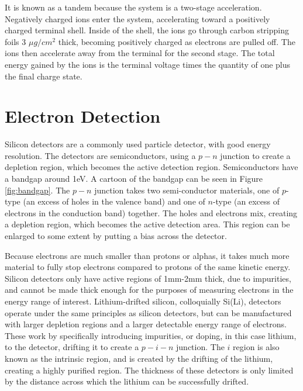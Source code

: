 It is known as a tandem because the system is a two-stage acceleration. Negatively charged ions enter the system, accelerating toward a positively charged terminal shell. Inside of the shell, the ions go through carbon stripping foils 3 $\mu g/cm^2$ thick, becoming positively charged as electrons are pulled off. The ions then accelerate away from the terminal for the second stage. The total energy gained by the ions is the terminal voltage times the quantity of one plus the final charge state.



\section{Electron Detection}

Silicon detectors are a commonly used particle detector, with good energy resolution. The detectors are semiconductors, using a $p-n$ junction to create a depletion region, which becomes the active detection region\citep{knoll00:rad_det_meas}. Semiconductors have a bandgap around 1eV. A cartoon of the bandgap can be seen in Figure \ref{fig:bandgap}. The $p-n$ junction takes two semi-conductor materials, one of $p$-type (an excess of holes in the valence band) and one of $n$-type (an excess of electrons in the conduction band) together. The holes and electrons mix, creating a depletion region, which becomes the active detection area. This region can be enlarged to some extent by putting a bias across the detector.



Because electrons are much smaller than protons or alphas, it takes much more material to fully stop electrons compared to protons of the same kinetic energy. Silicon detectors only have active regions of 1mm-2mm thick, due to impurities, and cannot be made thick enough for the purposes of measuring electrons in the energy range of interest. Lithium-drifted silicon, colloquially Si(Li), detectors operate under the same principles as silicon detectors, but can be manufactured with larger depletion regions and a larger detectable energy range of electrons. These work by specifically introducing impurities, or doping, in this case lithium, to the detector, drifting it to create a $p-i-n$ junction. The $i$ region is also known as the intrinsic region, and is created by the drifting of the lithium, creating a highly purified region. The thickness of these detectors is only limited by the distance across which the lithium can be successfully drifted.

